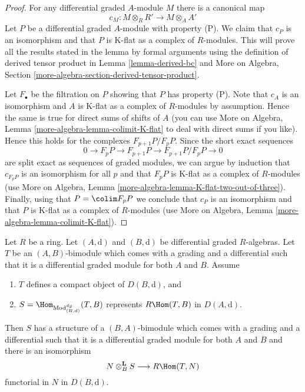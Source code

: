 \begin{proof}
For any differential graded $A$-module $M$ there is a canonical map
$$
c_M : M \otimes_R R' \longrightarrow M \otimes_A A'
$$
Let $P$ be a differential graded $A$-module with property (P).
We claim that $c_P$ is an isomorphism and that $P$ is K-flat
as a complex of $R$-modules. This will prove all the results
stated in the lemma by formal arguments using the definition
of derived tensor product in Lemma \ref{lemma-derived-bc} and
More on Algebra, Section \ref{more-algebra-section-derived-tensor-product}.

\medskip\noindent
Let $F_\bullet$ be the filtration on $P$ showing that $P$ has property (P).
Note that $c_A$ is an isomorphism and $A$ is K-flat as a complex
of $R$-modules by assumption. Hence the same is true for
direct sums of shifts of $A$ (you can use
More on Algebra, Lemma \ref{more-algebra-lemma-colimit-K-flat}
to deal with direct sums if you like).
Hence this holds for the complexes $F_{p + 1}P/F_pP$.
Since the short exact sequences
$$
0 \to F_pP \to F_{p + 1}P \to F_{p + 1}P/F_pP \to 0
$$
are split exact as sequences of graded modules, we can argue
by induction that $c_{F_pP}$ is an isomorphism for all $p$
and that $F_pP$ is K-flat as a complex of $R$-modules (use
More on Algebra, Lemma \ref{more-algebra-lemma-K-flat-two-out-of-three}).
Finally, using that $P = \colim F_pP$ we conclude that
$c_P$ is an isomorphism and that $P$ is K-flat
as a complex of $R$-modules (use
More on Algebra, Lemma \ref{more-algebra-lemma-colimit-K-flat}).
\end{proof}

\begin{lemma}
\label{lemma-RHom-is-tensor}
Let $R$ be a ring.
Let $(A, \text{d})$ and $(B, \text{d})$ be differential graded $R$-algebras.
Let $T$ be an $(A, B)$-bimodule which comes with a grading and a differential
such that it is a differential graded module for both $A$ and $B$.
Assume
\begin{enumerate}
\item $T$ defines a compact object of $D(B, \text{d})$, and
\item $S = \Hom_{\text{Mod}^{dg}_{(B, \text{d})}}(T, B)$
represents $R\Hom(T, B)$ in $D(A, \text{d})$.
\end{enumerate}
Then $S$ has a structure of a $(B, A)$-bimodule which comes with a grading
and a differential such that it is a differential graded module for both
$A$ and $B$ and there is an isomorphism
$$
N \otimes_B^\mathbf{L} S \longrightarrow R\Hom(T, N)
$$
functorial in $N$ in $D(B, \text{d})$.
\end{lemma}

